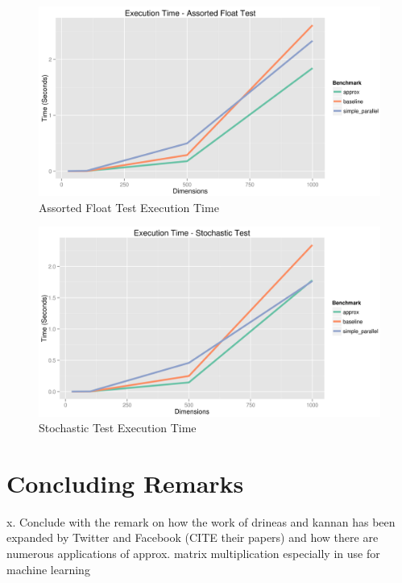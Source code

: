 \documentclass[oneside]{article}
\begin{document}
\begin{figure}[ht!]
\centering
\includegraphics[width=\textwidth]{figures/assorted_float}
\caption{Assorted Float Test Execution Time}
\label{fig:assorted_float}
\end{figure}

\begin{figure}[ht!]
\centering
\includegraphics[width=\textwidth]{figures/stochastic}
\caption{Stochastic Test Execution Time}
\label{fig:stochastic}
\end{figure}



\section{Concluding Remarks}


x. Conclude with the remark on how the work of drineas and kannan has been expanded by Twitter and Facebook (CITE their papers) and how there are numerous applications of approx. matrix multiplication especially
in use for machine learning




\singlespacing

\end{document}

